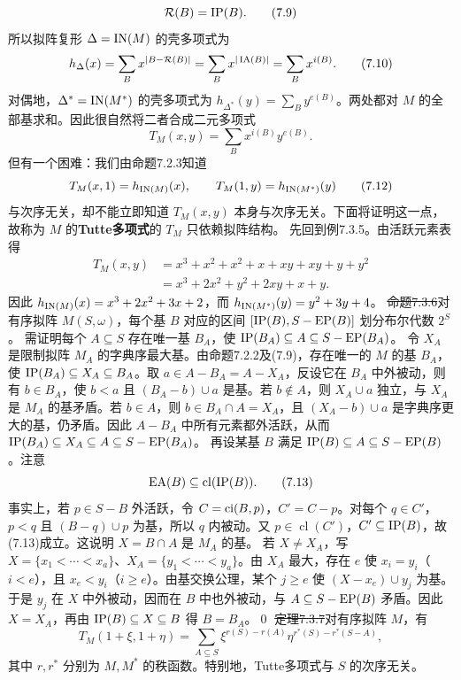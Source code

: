 \[\mathcal R(B)=\operatorname{IP}(B).\tag{7.9}\]
所以拟阵复形 $\Delta=\operatorname{IN}(M)$ 的壳多项式为
\[h_\Delta(x)=\sum_Bx^{|B-\mathcal R(B)|}=\sum_Bx^{|\operatorname{IA}(B)|}=\sum_Bx^{i(B)}.\tag{7.10}\]
对偶地，$\Delta^*=\operatorname{IN}(M^*)$ 的壳多项式为 $h_{\Delta^*}(y)=\sum_By^{e(B)}$。两处都对 $M$ 的全部基求和。因此很自然将二者合成二元多项式
\[T_M(x,y)=\sum_Bx^{i(B)}y^{e(B)}.\tag{7.11}\]
但有一个困难：我们由命题7.2.3知道
\[T_M(x,1)=h_{\operatorname{IN}(M)}(x),\qquad T_M(1,y)=h_{\operatorname{IN}(M^*)}(y)\tag{7.12}\]
与次序无关，却不能立即知道 $T_M(x,y)$ 本身与次序无关。下面将证明这一点，故称为 $M$ 的\textbf{Tutte多项式}的 $T_M$ 只依赖拟阵结构。
先回到例7.3.5。由活跃元素表得
\[\begin{aligned}
T_M(x,y)&=x^3+x^2+x^2+x+xy+xy+y+y^2\\
&=x^3+2x^2+y^2+2xy+x+y.
\end{aligned}\]
因此 $h_{\operatorname{IN}(M)}(x)=x^3+2x^2+3x+2$，而 $h_{\operatorname{IN}(M^*)}(y)=y^2+3y+4$。
\st{命题7.3.6}对有序拟阵 $M(S,\omega)$，每个基 $B$ 对应的区间 $[\operatorname{IP}(B),S-\operatorname{EP}(B)]$ 划分布尔代数 $2^S$。
\pr 需证明每个 $A\subseteq S$ 存在唯一基 $B_A$，使 $\operatorname{IP}(B_A)\subseteq A\subseteq S-\operatorname{EP}(B_A)$。
令 $X_A$ 是限制拟阵 $M_A$ 的字典序最大基。由命题7.2.2及(7.9)，存在唯一的 $M$ 的基 $B_A$，使 $\operatorname{IP}(B_A)\subseteq X_A\subseteq B_A$。取 $a\in A-B_A=A-X_A$，反设它在 $B_A$ 中外被动，则有 $b\in B_A$，使 $b<a$ 且 $(B_A-b)\cup a$ 是基。若 $b\notin A$，则 $X_A\cup a$ 独立，与 $X_A$ 是 $M_A$ 的基矛盾。若 $b\in A$，则 $b\in B_A\cap A=X_A$，且 $(X_A-b)\cup a$ 是字典序更大的基，仍矛盾。因此 $A-B_A$ 中所有元素都外活跃，从而 $\operatorname{IP}(B_A)\subseteq X_A\subseteq A\subseteq S-\operatorname{EP}(B_A)$。
再设某基 $B$ 满足 $\operatorname{IP}(B)\subseteq A\subseteq S-\operatorname{EP}(B)$。注意
\[\operatorname{EA}(B)\subseteq\operatorname{cl}(\operatorname{IP}(B)).\tag{7.13}\]
事实上，若 $p\in S-B$ 外活跃，令 $C=\operatorname{ci}(B,p)$，$C'=C-p$。对每个 $q\in C'$，$p<q$ 且 $(B-q)\cup p$ 为基，所以 $q$ 内被动。又 $p\in\operatorname{cl}(C')$，$C'\subseteq\operatorname{IP}(B)$，故(7.13)成立。这说明 $X=B\cap A$ 是 $M_A$ 的基。
若 $X\ne X_A$，写 $X=\{x_1<\cdots<x_a\}$、$X_A=\{y_1<\cdots<y_a\}$。由 $X_A$ 最大，存在 $e$ 使 $x_i=y_i$（$i<e$），且 $x_e<y_i$（$i\ge e$）。由基交换公理，某个 $j\ge e$ 使 $(X-x_e)\cup y_j$ 为基。于是 $y_j$ 在 $X$ 中外被动，因而在 $B$ 中也外被动，与 $A\subseteq S-\operatorname{EP}(B)$ 矛盾。因此 $X=X_A$，再由 $\operatorname{IP}(B)\subseteq X\subseteq B$ 得 $B=B_A$。\qed
\st{定理7.3.7}对有序拟阵 $M$，有
\[T_M(1+\xi,1+\eta)=\sum_{A\subseteq S}\xi^{r(S)-r(A)}\eta^{r^*(S)-r^*(S-A)},\]
其中 $r,r^*$ 分别为 $M,M^*$ 的秩函数。特别地，Tutte多项式与 $S$ 的次序无关。
